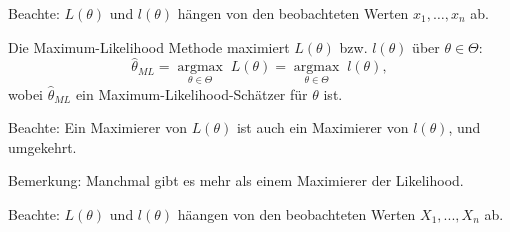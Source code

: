 \documentclass{tstextbook}
\begin{document}
\begin{remark}
	Beachte: $ L(\theta) $ und $ l(\theta) $ hängen von den beobachteten Werten $ x_1,\ldots,x_n $ ab.
\end{remark}

Die Maximum-Likelihood Methode  maximiert $ L(\theta) $ bzw. $ l(\theta) $ über $ \theta\in\Theta $: \\
\[
\hat{\theta}_{ML} = \underset{\theta\in\Theta}{\operatorname{argmax}} \; L(\theta)
=  \underset{\theta\in\Theta}{\operatorname{argmax}} \; l(\theta),
\]
wobei $ \hat{\theta}_{ML} $ ein Maximum-Likelihood-Schätzer für $ \theta $ ist. 

\begin{remark}
	Beachte: Ein Maximierer von $ L(\theta) $ ist auch ein Maximierer von $ l(\theta) $, und umgekehrt.
\end{remark}

\begin{remark}
	Bemerkung: Manchmal gibt es mehr als einem Maximierer der Likelihood.
\end{remark}

\begin{remark}
	Beachte: $ L(\theta) $ und $ l(\theta) $ häangen von den beobachteten Werten $ X_1,...,X_n $ ab.
\end{remark}
\end{document}
